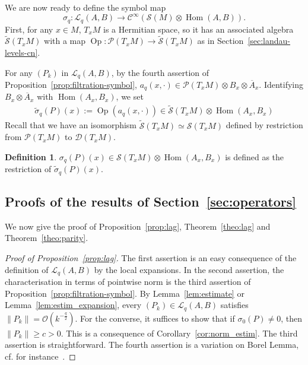 \documentclass[10pt,a4paper]{article}
\theoremstyle{definition}
\newtheorem{defi}[theo]{Definition}
\numberwithin{equation}{section}
\newcommand{\si}{{\sigma}}
\newcommand{\con}{\overline}
\newcommand{\op}{\operatorname}
\newcommand{\Ci}{{\mathcal{C}}^{\infty}}
\newcommand{\bigo}{\mathcal{O}}
\newcommand{\D}{\mathcal{D}}
\newcommand{\symb}{\mathcal{S}}
\newcommand{\lag}{\mathcal{L}}
\newcommand{\pol}{\mathcal{P}}
\begin{document}
We are now ready to define the symbol map
\[
\si_q : \lag_q (A,B) \rightarrow \Ci (
\symb(M) \otimes \op{Hom} (A,B)).
\]
First, for any $x \in M$, $T_xM$ is a Hermitian space, so it has an associated algebra $\widetilde{\symb} (T_xM)$ with a map $\op{Op}:\pol (T_xM) \rightarrow \widetilde{\symb} (T_xM)$ as in Section~\ref{sec:landau-levels-cn}.

For any $(P_k)$ in $\lag_q (A,B)$, by the fourth assertion of Proposition~\ref{prop:filtration-symbol}, $a_q(x,
\cdot) \in \pol (T_xM) \otimes B_x \otimes \con{A}_x$. Identifying $B_x
\otimes \con{A}_x$ with $ \op{Hom} (A_x, B_x)$, we set
\begin{gather}\label{eq:def_si_tilde}
\widetilde{ \si}_q (P) (x) := \op{Op} (a_q(x, \cdot)) \in
\widetilde{\symb} (T_xM) \otimes \op{Hom}(A_x, B_x)
\end{gather}
Recall that we have an isomorphism $\widetilde{\symb} (T_xM) \simeq \symb (T_xM)$ defined by restriction from $\pol (T_xM)$ to $\D (T_xM)$.

\begin{defi}\label{def:symbol}
$\si _q (P) (x) \in \symb (T_xM) \otimes \op{Hom}(A_x, B_x)$ is defined as the restriction of $\widetilde{\si}_q (P) (x)$.
\end{defi}

\subsection{Proofs of the results of Section~\ref{sec:operators}} \label{sec:proofs-results}
We now give the proof of Proposition~\ref{prop:lag}, Theorem~\ref{theo:lag} and Theorem~\ref{theo:parity}.

\begin{proof}[Proof of Proposition~\ref{prop:lag}]
The first assertion is an easy consequence of the definition of $\lag_q (A,B)$ by the local expansions. In the second assertion, the characterisation in terms of pointwise norm is the third assertion of Proposition~\ref{prop:filtration-symbol}. By Lemma~\ref{lem:estimate} or Lemma~\ref{lem:estim_expansion}, every $(P_k) \in \lag_q(A,B)$ satisfies $\| P_k \| = \bigo (k^{-\frac{q}{2}})$. For the converse, it suffices to show that if $\si_0 (P) \neq 0$, then $\| P _k \| \geqslant c >0$. This is a consequence of Corollary~\ref{cor:norm_estim}. The third assertion is straightforward. The fourth assertion is a variation on Borel Lemma, cf. for instance~\cite[Proposition~2.1]{oim}.
\end{proof}
\end{document}
